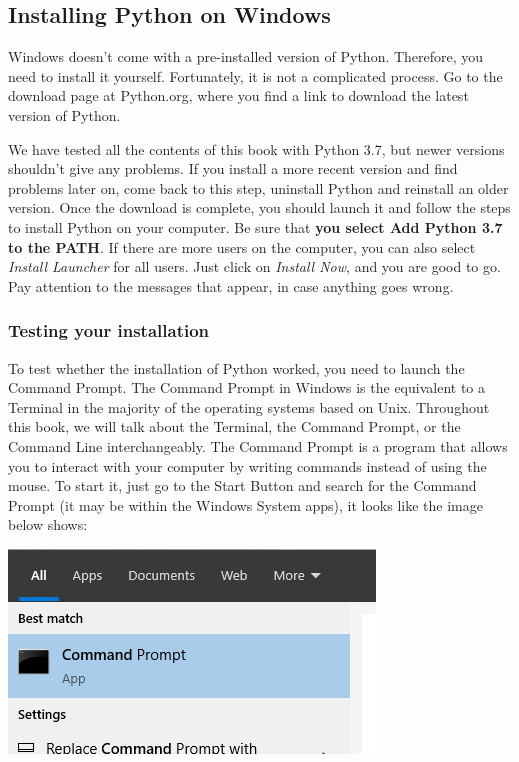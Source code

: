 \subsection{Installing Python on Windows}\label{subsec:python-installation-on-windows}
Windows doesn't come with a pre-installed version of Python. Therefore, you need to install it yourself. Fortunately, it is not a complicated process. Go to the download page at Python.org, where you find a link to download the latest version of Python.

We have tested all the contents of this book with Python 3.7, but newer versions shouldn't give any problems. If you install a more recent version and find problems later on, come back to this step, uninstall Python and reinstall an older version. Once the download is complete, you should launch it and follow the steps to install Python on your computer. Be sure that \textbf{you select Add Python 3.7 to the PATH}. If there are more users on the computer, you can also select \emph{Install Launcher} for all users. Just click on \textit{Install Now}, and you are good to go. Pay attention to the messages that appear, in case anything goes wrong.

\subsubsection{Testing your installation}
To test whether the installation of Python worked, you need to launch the Command Prompt. The Command Prompt in Windows is the equivalent to a Terminal in the majority of the operating systems based on Unix. Throughout this book, we will talk about the Terminal, the Command Prompt, or the Command Line interchangeably. The Command Prompt is a program that allows you to interact with your computer by writing commands instead of using the mouse. To start it, just go to the Start Button and search for the Command Prompt (it may be within the Windows System apps), it looks like the image below shows:

\begin{center}
\includegraphics[width=.5\textwidth]{images/Chapter_02/CommandPrompt.png}
\end{center}

